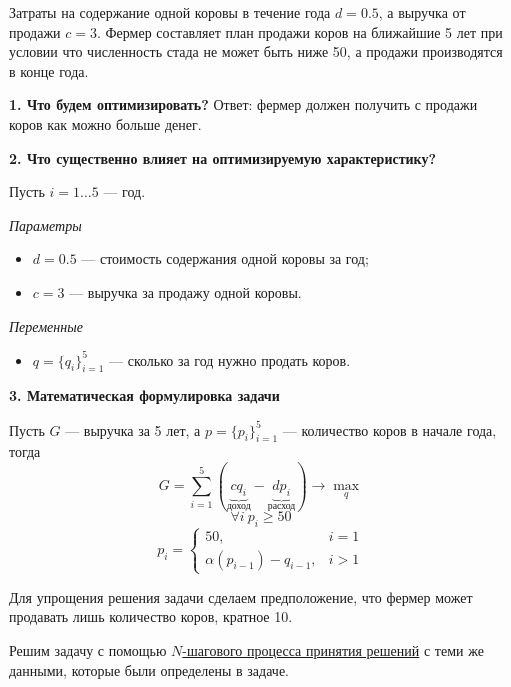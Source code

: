 Затраты на содержание одной коровы в течение года $d = 0.5$, а выручка от продажи $c = 3$. Фермер составляет план продажи коров на ближайшие 5 лет при условии что численность стада не может быть ниже 50, а продажи производятся в конце года.

\mathmodel

\textbf{1. Что будем оптимизировать?} Ответ: фермер должен получить с продажи коров как можно больше денег.

\bigskip

\textbf{2. Что существенно влияет на оптимизируемую характеристику?}

Пусть $i = 1 \dots 5$ --- год.

\bigskip

\textit{Параметры}

\begin{itemize}[nosep]
	\item $d = 0.5$ --- стоимость содержания одной коровы за год;
	
	\item $c = 3$ --- выручка за продажу одной коровы.
\end{itemize}

\bigskip

\textit{Переменные}

\begin{itemize}[nosep]	
	\item $q = \{q_i\}_{i=1}^5$ --- сколько за год нужно продать коров.
\end{itemize}

\bigskip

\textbf{3. Математическая формулировка задачи}

Пусть $G$ --- выручка за 5 лет, а $p = \{p_i\}_{i=1}^5$ --- количество коров в начале года, тогда
\[G = \sum_{i=1}^{5} (\underbrace{c q_i}_{\text{доход}} - \underbrace{d p_i}_{\text{расход}}) \to \max_{q}\]
\[\forall  i \ p_i \ge 50\]
\[p_i = \begin{cases}\tag{*}
	50,& i = 1 \\
	\alpha(p_{i - 1}) - q_{i - 1},& i > 1
\end{cases}
\]

\solution

Для упрощения решения задачи сделаем предположение, что фермер может продавать лишь количество коров, кратное 10.

Решим задачу с помощью \hyperref[def:n_step_process]{$N$-шагового процесса принятия решений} с теми же данными, которые были определены в задаче.

